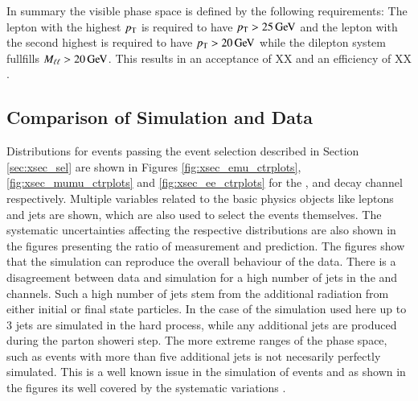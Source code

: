 In summary the visible phase space is defined by the following requirements: The lepton with the highest $p_{\mathrm{T}}$ is required to have $p_{\mathrm{T}} > 25 \,\text{Ge\hspace{-.08em}V}$ and the lepton with the second highest \pt is required to have $p_{\mathrm{T}} > 20 \,\text{Ge\hspace{-.08em}V}$ while the dilepton system fullfills $M_{\ell\ell} > 20 \,\text{Ge\hspace{-.08em}V}$.
This results in an acceptance of XX and an efficiency of XX .

\subsection{Comparison of Simulation and Data}
\label{sec:xsec_datamc}

Distributions for events passing the event selection described in Section \ref{sec:xsec_sel} are shown in Figures \ref{fig:xsec_emu_ctrplots}, \ref{fig:xsec_mumu_ctrplots} and \ref{fig:xsec_ee_ctrplots} for the \emu, \mumu and \ee decay channel respectively. Multiple variables related to the basic physics objects like leptons and jets are shown, which are also used to select the events themselves.
The systematic uncertainties affecting the respective distributions are also shown in the figures presenting the ratio of measurement and prediction. The figures show that the simulation can reproduce the overall behaviour of the data. 
There is a disagreement between data and simulation for a high number of jets in the \emu and \mumu channels. Such a high number of jets stem from the additional radiation from either initial or final 
state particles. In the case of the simulation used here  up to 3 jets are simulated in the hard process, while any additional jets are produced during the parton showeri step.
The more extreme ranges of the phase space, such as events with more than five additional jets is not necesarily perfectly simulated.
This is a well known issue in the simulation of \ttbar events and as shown in the figures its well covered by the systematic variations . 

